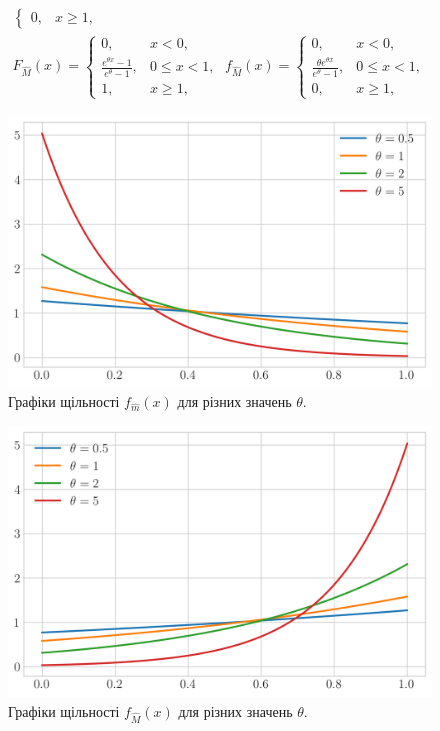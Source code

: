 \begin{theorem}
\begin{gather}
\begin{cases}
            0, & x \geq 1,
        \end{cases}
        \\
        F_{\widehat{M}}(x) = \begin{cases}
            0, & x < 0, \\
            \frac{e^{\theta x} - 1}{e^{\theta} - 1}, & 0 \leq x < 1, \\
            1, & x \geq 1,
        \end{cases}\;
        f_{\widehat{M}}(x) = \begin{cases}
            0, & x < 0, \\
            \frac{\theta e^{\theta x}}{e^{\theta} - 1}, & 0 \leq x < 1, \\
            0, & x \geq 1,
        \end{cases}
    \end{gather}
    \begin{figure}[H]
        \centering
        \includegraphics[scale=0.65]{plots/pdf_min_hat.png}
        \caption{Графіки щільності $f_{\widehat{m}}(x)$ для різних значень $\theta$.}
    \end{figure}
    \begin{figure}[H]
        \centering
        \includegraphics[scale=0.65]{plots/pdf_max_hat.png}
        \caption{Графіки щільності $f_{\widehat{M}}(x)$ для різних значень $\theta$.}
    \end{figure}
\end{theorem}
